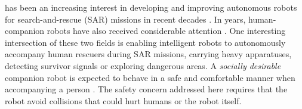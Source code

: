 \documentclass[journal]{IEEEtran}
\newcommand{\todohere}[1]{\hl{(\textbf{TODO:} #1)}}
\DeclareRobustCommand{\clnote}[1]{\ifthenelse{\boolean{include-notes}}%
{\textcolor{orange}{\textbf{CL: #1}}}{}}
\DeclareRobustCommand{\dhnote}[1]{\ifthenelse{\boolean{include-notes}}%
{\textcolor{blue}{\textbf{DH: #1}}}{}}
\begin{document}
     has been an increasing interest in developing and improving autonomous robots for search-and-rescue (SAR) missions in recent decades \cite{casper2003human,shen2011autonomous,ryan2013lmi,govindarajan2016human,kruijff2012designing}.
	In years, human-companion robots have also received considerable attention \cite{rios2015proxemics,ferrer2016robot,cosgun2013autonomous}. One interesting intersection of these two fields is enabling intelligent robots to autonomously accompany human rescuers during SAR missions, carrying heavy apparatuses, detecting survivor signals or exploring dangerous areas.
    A \textit{socially desirable} companion robot is expected to behave in a safe and comfortable manner when accompanying a person \cite{kruse2013human,rios2015proxemics}.
    The safety concern addressed here requires that the robot avoid collisions that could hurt humans or the robot itself\cite{svenstrup2010trajectory}.
\end{document}
